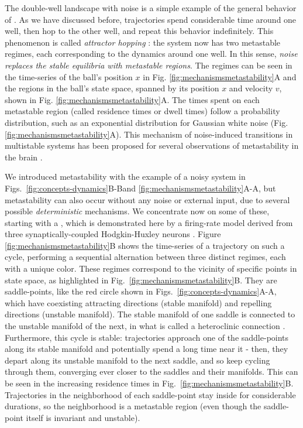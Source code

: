 The double-well landscape with noise is a simple example of the general behavior of . As we have discussed before, trajectories spend considerable time around one well, then hop to the other well, and repeat this behavior indefinitely. This phenomenon is called \textit{attractor hopping} \cite{kraut2002multistability}: the system now has two metastable regimes, each corresponding to the dynamics around one well. In this sense, \textit{noise replaces the stable equilibria with metastable regions}. The regimes can be seen in the time-series of the ball's position $x$ in Fig. \ref{fig:mechanismsmetastability}A and the regions in the ball's state space, spanned by its position $x$ and velocity $v$, shown in Fig. \ref{fig:mechanismsmetastability}A\supprime. The times spent on each metastable region (called residence times or dwell times) follow a probability distribution, such as an exponential distribution for Gaussian white noise \cite{hanggi1986escape} (Fig. \ref{fig:mechanismsmetastability}A\textsuperscript{\everymodeprime\everymodeprime}). This mechanism of noise-induced transitions in multistable systems has been proposed for several observations of metastability in the brain \cite{brinkman2022metastable, hudson2017metastability}.

We introduced metastability with the example of a noisy system in Figs.~\ref{fig:concepts-dynamics}B-B\supprime and \ref{fig:mechanismsmetastability}A-A\ssupprime, but metastability can also occur without any noise or external input, due to several possible \textit{deterministic} mechanisms. We concentrate now on some of these, starting with a , which is demonstrated here by a firing-rate model derived from three synaptically-coupled Hodgkin-Huxley neurons \cite{ashwin2011criteria}. Figure \ref{fig:mechanismsmetastability}B shows the time-series of a trajectory on such a cycle, performing a sequential alternation between three distinct regimes, each with a unique color. These regimes correspond to the vicinity of specific points in state space, as highlighted in Fig.~\ref{fig:mechanismsmetastability}B\supprime. They are saddle-points, like the red circle shown in Figs.~\ref{fig:concepts-dynamics}A-A\supprime, which have coexisting attracting directions (stable manifold) and repelling directions (unstable manifold). The stable manifold of one saddle is connected to the unstable manifold of the next, in what is called a heteroclinic connection \cite{ott2002chaos}. Furthermore, this cycle is stable: trajectories approach one of the saddle-points along its stable manifold and potentially spend a long time near it - then, they depart along its unstable manifold to the next saddle, and so keep cycling through them, converging ever closer to the saddles and their manifolds. This can be seen in the increasing residence times in Fig.~\ref{fig:mechanismsmetastability}B\ssupprime. Trajectories in the neighborhood of each saddle-point stay inside for considerable durations, so the neighborhood is a metastable region (even though the saddle-point itself is invariant and unstable).

